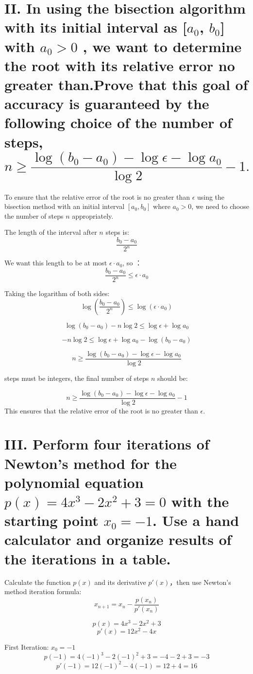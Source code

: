 \documentclass[a4paper]{article}
\begin{document}
\section*{II. In using the bisection algorithm with its initial interval as [$a_0$, $b_0$] with $a_0 > 0$ , we want to determine the root with its relative error no greater than.Prove that this goal of accuracy is guaranteed by the following choice of the number of steps,\[n \geq \frac{\log(b_0 - a_0) - \log \epsilon - \log a_0}{\log 2} - 1.\]}

To ensure that the relative error of the root is no greater than \( \epsilon \) using the bisection method with an initial interval \([a_0, b_0]\) where \( a_0 > 0 \), we need to choose the number of steps \( n \) appropriately. 

The length of the interval after \( n \) steps is:
\[\frac{b_0 - a_0}{2^n}\]

We want this length to be at most \( \epsilon \cdot a_0 \), so ：
\[\frac{b_0 - a_0}{2^n} \leq \epsilon \cdot a_0\]

Taking the logarithm of both sides:
\[\log \left( \frac{b_0 - a_0}{2^n} \right) \leq \log(\epsilon \cdot a_0)\]

\[\log (b_0 - a_0) - n \log 2 \leq \log \epsilon + \log a_0\]

\[-n \log 2 \leq \log \epsilon + \log a_0 - \log (b_0 - a_0)\]

\[n \geq \frac{\log (b_0 - a_0) - \log \epsilon - \log a_0}{\log 2}\]

steps must be integers, the final number of steps \( n \) should be:

\[n \geq \frac{\log (b_0 - a_0) - \log \epsilon - \log a_0}{\log 2} - 1\]
This ensures that the relative error of the root is no greater than \( \epsilon \).

\section*{III. Perform four iterations of Newton’s method for the polynomial equation $p(x) = 4x^3 - 2x^2 + 3 = 0$ with the starting point $x_0 = -1$. Use a hand calculator and organize results of the iterations in a table.}  

Calculate the function  \( p(x) \) and its derivative \( p'(x) \)，then use Newton's method iteration formula:
\[ x_{n+1} = x_n - \frac{p(x_n)}{p'(x_n)} \]

\[ p(x) = 4x^3 - 2x^2 + 3 \]
\[ p'(x) = 12x^2 - 4x \]

First Iteration:
\(x_0 = -1\)
\[p(-1) = 4(-1)^3 - 2(-1)^2 + 3 = -4 - 2 + 3 = -3\]\[p'(-1) = 12(-1)^2 - 4(-1) = 12 + 4 = 16\]
   
\end{document}
